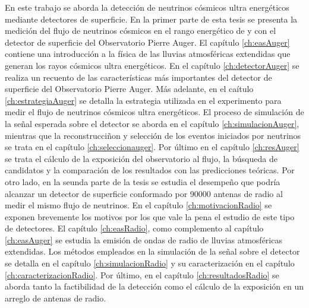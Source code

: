 En este trabajo se aborda la detecci\'on de neutrinos c\'osmicos ultra energ\'eticos mediante detectores de superficie.
En la primer parte de esta tesis se presenta la medici\'on del flujo de neutrinos c\'osmicos en el rango energ\'etico de  y  con el detector de superficie del Observatorio Pierre Auger.
El cap\'itulo \ref{ch:easAuger} contiene una introducci\'on a la f\'isica de las lluvias atmosf\'ericas extendidas que generan los rayos c\'osmicos ultra energ\'eticos. 
En el cap\'itulo \ref{ch:detectorAuger} se realiza un recuento de las caracter\'isticas m\'as importantes del detector de superficie del Observatorio Pierre Auger.
M\'as adelante, en el ca\'itulo \ref{ch:estrategiaAuger} se detalla la estrategia utilizada en el experimento para medir el flujo de neutrinos c\'osmicos ultra energ\'eticos.
El proceso de simulaci\'on de la se\~nal esperada sobre el detector se aborda en el cap\'itulo \ref{ch:simulacionAuger}, mientras que la reconstrucci\~non y selecci\'on de los eventos iniciados por neutrinos se trata en el cap\'itulo \ref{ch:seleccionauger}.
Por \'ultimo en el cap\'itulo \ref{ch:resAuger} se trata el c\'alculo de la exposici\'on del observatorio al flujo, la b\'usqueda de candidatos y la comparaci\'on de los resultados con las predicciones te\'oricas.
Por otro lado, en la seunda parte de la tesis se estudia el desempe\~no que podr\'ia alcanzar un detector de superficie conformado por 90000 antenas de radio al medir el mismo flujo de neutrinos.
En el cap\'itulo \ref{ch:motivacionRadio} se exponen brevemente los motivos por los que vale la pena el estudio de este tipo de detectores.
El cap\'itulo \ref{ch:easRadio}, como complemento al cap\'itulo \ref{ch:easAuger} se estudia la emisi\'on de ondas de radio de lluvias atmosf\'ericas extendidas.
Los m\'etodos empleados en la simulaci\'on de la se\~nal sobre el detector se detalla en el cap\'itulo \ref{ch:simulacionRadio} y su caracterizaci\'on en el cap\'itulo \ref{ch:caracterizacionRadio}.
Por \'ultimo, en el cap\'itulo \ref{ch:resultadosRadio} se aborda tanto la factibilidad de la detecci\'on como el c\'alculo de la exposici\'on en un arreglo de antenas de radio.

